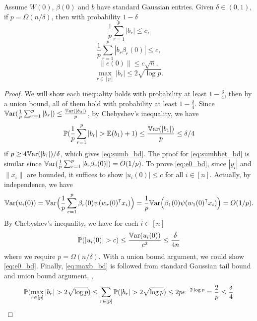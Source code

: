 \begin{lemma}
\label{lma:inqs}
Assume $W(0)$, $\beta(0)$ and $b$ have \iid standard Gaussian entries. Given $\delta\in(0,1)$, if $p=\Omega(n/\delta)$, then with probability $1-\delta$
\begin{equation}\label{eq:sumb_bd}
    \frac{1}{p}\sum_{r=1}^p|b_r| \leq c,
\end{equation}
\begin{equation}\label{eq:sumbbet_bd}
    \frac{1}{p}\sum_{r=1}^p|b_r\beta_r(0)| \leq c,
\end{equation}
\begin{equation}\label{eq:e0_bd}
    \|e(0)\| \leq c\sqrt n,
\end{equation}
\begin{equation}\label{eq:maxb_bd}
    \max_{r\in[p]}|b_r|\leq 2\sqrt{\log p}.
\end{equation}
\end{lemma}
\begin{proof}
We will show each inequality holds with probability at least $1-\frac{\delta}{4}$, then by a union bound, all of them hold with probability at least $1-\frac{\delta}{4}$. Since $\mathbb{V}\mathrm{ar}(\frac{1}{p}\sum_{r=1}^p|b_r|)\leq \frac{\mathbb{V}\mathrm{ar}(|b_0|)}{p}$, by Chebyshev's inequality, we have 
\begin{equation*}
    \operatorname{\mathbb{P}}(\frac{1}{p}\sum_{r=1}^p|b_r| > \mathbb{E}(b_1) + 1) \leq \frac{\mathbb{V}\mathrm{ar}(|b_1|)}{p} \leq \delta/4
\end{equation*} 
if $p\geq 4\mathbb{V}\mathrm{ar}(|b_1|)/\delta$, which gives \eqref{eq:sumb_bd}. The proof for \eqref{eq:sumbbet_bd} is similar since $\mathbb{V}\mathrm{ar}(\frac{1}{p}\sum_{r=1}^p|b_r\beta_r(0)|)=O(1/p)$. To prove \eqref{eq:e0_bd}, since $|y_i|$ and $\|x_i\|$ are bounded, it suffices to show $|u_i(0)|\leq c$ for all $i\in [n]$. Actually, by independence, we have
\begin{equation*}
    \Var(u_i(0)) = \Var \Big(\frac{1}{p}\sum_{r=1}^p \beta_r(0)\psi(w_r(0)\transpose x_i)\Big) = \frac{1}{p}\Var\Big(\beta_1(0)\psi(w_1(0)\transpose x_i)\Big) = O(1/p).
\end{equation*}
By Chebyshev's inequality, we have for each $i\in [n]$
\begin{equation*}
    \prob(|u_i(0)|> c) \leq \frac{\Var(u_i(0))}{c^2} \leq \frac{\delta}{4n}
\end{equation*}
where we require $p=\Omega(n/\delta)$. With a union bound argument, we could show \eqref{eq:e0_bd}. Finally, \eqref{eq:maxb_bd} is followed from standard Gaussian tail bound and union bound argument, \ie,
\begin{equation*}
    \operatorname{\mathbb{P}}(\max_{r\in[p]}|b_r| > 2\sqrt{\log p}) \leq \sum_{r\in [p]}\operatorname{\mathbb{P}}(|b_r| > 2\sqrt{\log p}) \leq 2pe^{-2\log p} = \frac{2}{p} \leq \frac{\delta}{4}
\end{equation*}
\end{proof}

